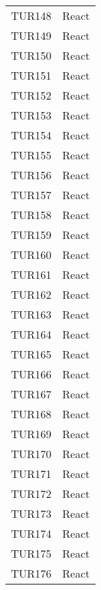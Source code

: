 \documentclass[PianoDiQualifica.tex]{subfiles}
\begin{document}
\begin{longtable}[H]{P{5cm}P{9cm}}
	TUR148 & React \\ 
	TUR149 & React \\ 
	TUR150 & React \\ 
	TUR151 & React \\ 
	TUR152 & React \\ 
	TUR153 & React \\ 
	TUR154 & React \\ 
	TUR155 & React \\ 
	TUR156 & React \\ 
	TUR157 & React \\ 
	TUR158 & React \\ 
	TUR159 & React \\ 
	TUR160 & React \\ 
	TUR161 & React \\ 
	TUR162 & React \\ 
	TUR163 & React \\ 
	TUR164 & React \\ 
	TUR165 & React \\ 
	TUR166 & React \\ 
	TUR167 & React \\ 
	TUR168 & React \\ 
	TUR169 & React \\ 
	TUR170 & React \\ 
	TUR171 & React \\ 
	TUR172 & React \\ 
	TUR173 & React \\ 
	TUR174 & React \\ 
	TUR175 & React \\ 
	TUR176 & React \\
	

\end{longtable}
\end{document}
